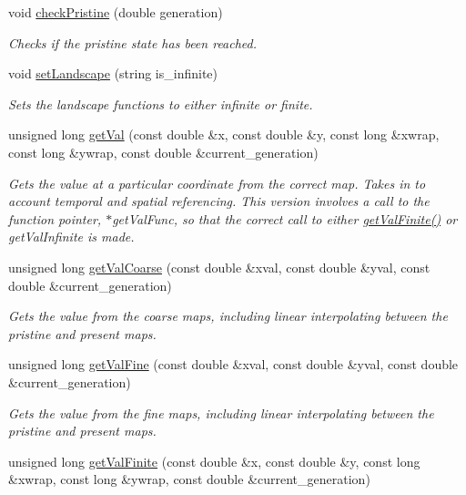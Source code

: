 \begin{DoxyCompactItemize}
\item 
void \hyperlink{class_map_af7067d6d076eb10b735dc08750dbf924}{check\+Pristine} (double generation)
\begin{DoxyCompactList}\small\item\em Checks if the pristine state has been reached. \end{DoxyCompactList}\item 
void \hyperlink{class_map_acaff6d6881f7547b824cb1a9086f8094}{set\+Landscape} (string is\+\_\+infinite)
\begin{DoxyCompactList}\small\item\em Sets the landscape functions to either infinite or finite. \end{DoxyCompactList}\item 
unsigned long \hyperlink{class_map_ab96b3097832c620a024184ed54d5e2d1}{get\+Val} (const double \&x, const double \&y, const long \&xwrap, const long \&ywrap, const double \&current\+\_\+generation)
\begin{DoxyCompactList}\small\item\em Gets the value at a particular coordinate from the correct map. Takes in to account temporal and spatial referencing. This version involves a call to the function pointer, $\ast$get\+Val\+Func, so that the correct call to either \hyperlink{class_map_a2c01cd7869a9500204381cdc231df27f}{get\+Val\+Finite()} or get\+Val\+Infinite is made. \end{DoxyCompactList}\item 
unsigned long \hyperlink{class_map_a901ae65dbd0c471acde50a5425ae6a69}{get\+Val\+Coarse} (const double \&xval, const double \&yval, const double \&current\+\_\+generation)
\begin{DoxyCompactList}\small\item\em Gets the value from the coarse maps, including linear interpolating between the pristine and present maps. \end{DoxyCompactList}\item 
unsigned long \hyperlink{class_map_adb6f68f81f080b0ff798a2b375e1563b}{get\+Val\+Fine} (const double \&xval, const double \&yval, const double \&current\+\_\+generation)
\begin{DoxyCompactList}\small\item\em Gets the value from the fine maps, including linear interpolating between the pristine and present maps. \end{DoxyCompactList}\item 
unsigned long \hyperlink{class_map_a2c01cd7869a9500204381cdc231df27f}{get\+Val\+Finite} (const double \&x, const double \&y, const long \&xwrap, const long \&ywrap, const double \&current\+\_\+generation)

\end{DoxyCompactItemize}
